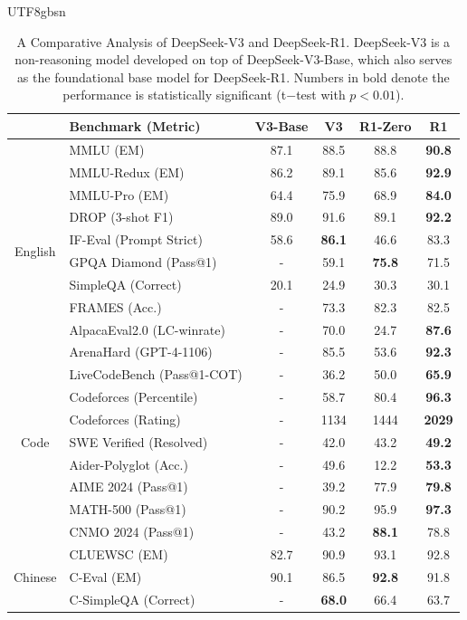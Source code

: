 \documentclass[11pt, a4paper, logo, copyright, nonumbering]{deepseek}
\begin{document}
\begin{CJK*}{UTF8}{gbsn}
\begin{table}[h]
    \centering
    \small
    \setlength{\tabcolsep}{1.9pt}
    \caption{A Comparative Analysis of DeepSeek-V3 and DeepSeek-R1. DeepSeek-V3 is a non-reasoning model developed on top of DeepSeek-V3-Base, which also serves as the foundational base model for DeepSeek-R1.  Numbers in bold denote the performance is statistically significant  (t$-$test with $p < 0.01$).}
    \begin{tabular}{@{}c l | c c  c  c}
    \toprule
     & \textbf{Benchmark {\tiny (Metric)}} & \textbf{V3-Base} & \textbf{V3} & \textbf{R1-Zero} & \textbf{R1} \\
    \midrule
    \multirow{10}{*}{English}& MMLU {\tiny (EM)} & 87.1 & 88.5 & 88.8 & \textbf{90.8}\\
     & MMLU-Redux {\tiny (EM)} & 86.2 & 89.1 & 85.6 & \textbf{92.9} \\
    & MMLU-Pro {\tiny (EM)}  & 64.4 & 75.9 & 68.9 & \textbf{84.0} \\
    & DROP {\tiny (3-shot F1)}  & 89.0 & 91.6 & 89.1 & \textbf{92.2}\\
    & IF-Eval {\tiny (Prompt Strict)}  & 58.6 & \textbf{86.1} & 46.6 & 83.3 \\
    & GPQA Diamond {\tiny (Pass@1)}  & - & 59.1 & \textbf{75.8} & 71.5 \\
    & SimpleQA {\tiny (Correct)}   & 20.1 & 24.9 & 30.3 & 30.1 \\
     & FRAMES {\tiny (Acc.)}   & - & 73.3 & 82.3 & 82.5\\
      & AlpacaEval2.0 {\tiny (LC-winrate)}  & - & 70.0 & 24.7 & \textbf{87.6}\\
       & ArenaHard {\tiny (GPT-4-1106)}  & - & 85.5 & 53.6 & \textbf{92.3}\\
    \midrule
    \multirow{7}{*}{Code} & LiveCodeBench {\tiny (Pass@1-COT)} & - & 36.2 & 50.0 & \textbf{65.9} \\
    & Codeforces {\tiny (Percentile)} & - & 58.7 & 80.4 & \textbf{96.3} \\
    & Codeforces {\tiny (Rating)} & - & 1134 & 1444 & \textbf{2029} \\
    & SWE Verified {\tiny (Resolved)} & - & 42.0 & 43.2 & \textbf{49.2} \\
    & Aider-Polyglot {\tiny (Acc.)}  & - & 49.6 & 12.2 & \textbf{53.3} \\
    \midrule
    \multirow{3}{*}{Math} & AIME 2024 {\tiny (Pass@1)} & - & 39.2 & 77.9 & \textbf{79.8} \\
    & MATH-500 {\tiny (Pass@1)} & - & 90.2 & 95.9 & \textbf{97.3} \\
    & CNMO 2024 {\tiny (Pass@1)} & - & 43.2 & \textbf{88.1} & 78.8 \\
    \midrule
    \multirow{3}{*}{Chinese} & CLUEWSC {\tiny (EM)} & 82.7 & 90.9 & 93.1 & 92.8\\
    & C-Eval {\tiny (EM)}  & 90.1 & 86.5 & \textbf{92.8} & 91.8\\
     & C-SimpleQA {\tiny (Correct)} & - & \textbf{68.0} & 66.4 & 63.7 \\
    \bottomrule
    \end{tabular}
    \label{tab:v3_full_compare}
\end{table}


\end{CJK*}
\end{document}
